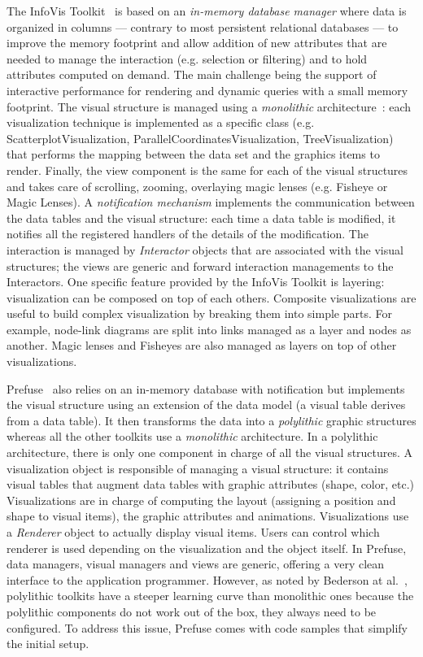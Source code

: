 The InfoVis Toolkit~\cite{InfoVis} is based on an \emph{in-memory
  database manager} where data is organized in columns --- contrary to
most persistent relational databases --- to improve the memory
footprint and allow addition of new attributes that are needed to
manage the interaction (e.g. selection or filtering) and to hold
attributes computed on demand.  The main challenge being the support
of interactive performance for rendering and dynamic queries with a
small memory footprint.  The visual structure is managed using a
\emph{monolithic} architecture~\cite{Polylithic}: each visualization
technique is implemented as a specific class
(e.g. ScatterplotVisualization, ParallelCoordinatesVisualization,
TreeVisualization) that performs the mapping between the data set and
the graphics items to render.  Finally, the view component is the same
for each of the visual structures and takes care of scrolling,
zooming, overlaying magic lenses (e.g. Fisheye or Magic Lenses).  A
\emph{notification mechanism} implements the communication between the
data tables and the visual structure: each time a data table is
modified, it notifies all the registered handlers of the details of
the modification. The interaction is managed by \emph{Interactor}
objects that are associated with the visual structures; the views are
generic and forward interaction managements to the Interactors.  One
specific feature provided by the InfoVis Toolkit is layering:
visualization can be composed on top of each others.  Composite
visualizations are useful to build complex visualization by breaking
them into simple parts. For example, node-link diagrams are split into
links managed as a layer and nodes as another.  Magic lenses and
Fisheyes are also managed as layers on top of other visualizations.

Prefuse~\cite{Prefuse} also relies on an in-memory database with
notification but implements the visual structure using an extension of
the data model (a visual table derives from a data table).  It then
transforms the data into a \emph{polylithic} graphic structures
whereas all the other toolkits use a \emph{monolithic} architecture.
In a polylithic architecture, there is only one component in charge of
all the visual structures.  A visualization object is responsible of
managing a visual structure: it contains visual tables that augment
data tables with graphic attributes (shape, color, etc.)
Visualizations are in charge of computing the layout (assigning a
position and shape to visual items), the graphic attributes and
animations.  Visualizations use a \emph{Renderer} object to actually
display visual items.  Users can control which renderer is used
depending on the visualization and the object itself.  In Prefuse,
data managers, visual managers and views are generic, offering a very
clean interface to the application programmer.  However, as noted by
Bederson at al.~\cite{Polylithic}, polylithic toolkits have a steeper
learning curve than monolithic ones because the polylithic components
do not work out of the box, they always need to be configured.  To
address this issue, Prefuse comes with code samples that simplify the
initial setup.

